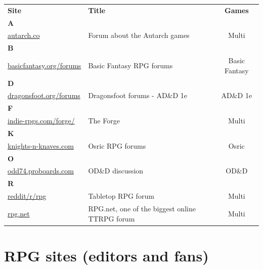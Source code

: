 \documentclass[a4paper, 11pt, twoside]{article}
\begin{document}
\begin{longtable}{llc}
\textbf{Site} & \textbf{Title} & \textbf{Games}\\
\textbf{A} &  & \\
\href{https://forum.autarch.co/}{autarch.co} & Forum about the Autarch games & Multi\\
\textbf{B} &  & \\
\href{https://www.basicfantasy.org/forums}{basicfantasy.org/forums} & Basic Fantasy RPG forums & Basic Fantasy\\
\textbf{D} &  & \\
\href{https://www.dragonsfoot.org/forums}{dragonsfoot.org/forums} & Dragonsfoot forums - AD\&D 1e & AD\&D 1e\\
\textbf{F} &  & \\
\href{http://www.indie-rpgs.com/forge/index.php}{indie-rpgs.com/forge/} & The Forge & Multi\\
\textbf{K} &  & \\
\href{https://www.knights-n-knaves.com/phpbb3/}{knights-n-knaves.com} & Osric RPG forums & Osric\\
\textbf{O} &  & \\
\href{https://odd74.proboards.com}{odd74.proboards.com} & OD\&D discussion & OD\&D\\
\textbf{R} &  & \\
\href{https://www.reddit.com/r/rpg/}{reddit/r/rpg} & Tabletop RPG forum & Multi\\
\href{https://www.rpg.net}{rpg.net} & RPG.net, one of the biggest online TTRPG forum & Multi\\
\end{longtable}

\section{RPG sites (editors and fans)}
\label{sec:orgba56e17}
\end{document}
